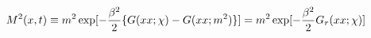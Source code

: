 \begin{equation}
M^2(x,t) \equiv   m^2 \exp[-{\beta^2 \over
2}\{G(xx;\chi)-G(xx;m^2) \} ]= m^2 \exp[-{\beta^2 \over
2}G_r(xx;\chi)]
\end{equation}

